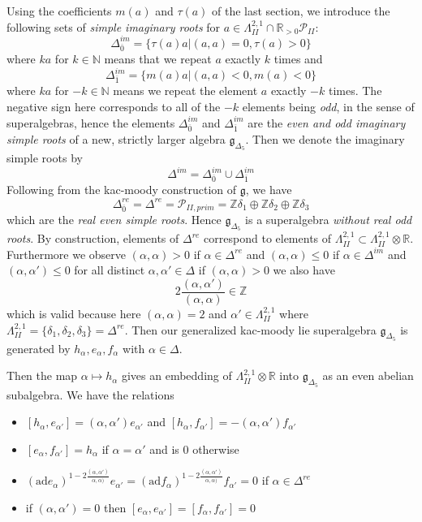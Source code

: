 \documentclass[9pt]{amsart} \usepackage[utf8]{inputenc}
\newcommand{\N}{\mathbb{N}}
\newcommand{\Z}{\mathbb{Z}} \newcommand{\C}{\mathbb{C}}
\newcommand{\R}{\mathbb{R}} \newcommand{\La}{\Lambda}
\newcommand{\Poly}{\mathcal{P}}
\newcommand{\bkm}{\mathfrak{g}}
\newcommand{\autcor}{\mathfrak{g}_{\Delta_5}}
\begin{document}
Using the coefficients $m(a)$ and $\tau(a)$ of the last section, we
introduce the following sets of \textit{simple imaginary roots} for $a \in
\La^{2,1}_{II} \cap \R_{>0} \Poly_{II}$:
$$\Delta_{\overline{0}}^{im} = \{\tau(a)a | (a,a) = 0,\tau(a)>0\}$$
where $ka$ for $k\in \N$ means that we repeat $a$ exactly $k$ times and
$$\Delta_{\overline{1}}^{im} = \{ m(a)a | (a,a) < 0 , m(a)< 0\}$$
where $ka$ for $-k \in \N$ means we repeat the element $a$ exactly $-k$
times. The negative sign here corresponds to all of the $-k$ elements
being \textit{odd}, in the sense of superalgebras, hence the elements
$\Delta_{\overline{0}}^{im}$ and $\Delta_{\overline{1}}^{im}$ are the
\textit{even and odd imaginary simple roots} of a new, strictly larger algebra
$\mathfrak{g}_{\Delta_5}$.
Then we denote the imaginary simple roots by $$\Delta^{im} = \Delta_{\overline{0}}^{im} \cup \Delta_{\overline{1}}^{im}$$
Following from the kac-moody construction of $\bkm$, we
have $$\Delta_{\overline{0}}^{re} = \Delta^{re} = \Poly_{II,prim} = \Z\delta_1 \oplus \Z\delta_2 \oplus \Z\delta_3$$ which are
the \textit{real even simple roots}. Hence
$\autcor$ is a superalgebra \textit{without real odd
roots}. By construction, elements of $\Delta^{re}$ correspond to
elements of $\La^{2,1}_{II} \subset \La^{2,1}_{II}\otimes \R$.
Furthermore we observe $(\alpha,\alpha) > 0$ if $\alpha \in \Delta^{re}$
and $(\alpha,\alpha) \leq 0$ if $\alpha \in \Delta^{im}$ and
$(\alpha,\alpha') \leq 0$ for all distinct $\alpha, \alpha' \in \Delta$ if
$(\alpha,\alpha) > 0$ we also have
$$2\frac{(\alpha,\alpha')}{(\alpha,\alpha)} \in \Z$$ which is valid
because here $(\alpha,\alpha) = 2$ and $\alpha' \in \La^{2,1}_{II}$
where $\La^{2,1}_{II} = \{\delta_1,\delta_2,\delta_3\} = \Delta^{re}$.
Then our generalized kac-moody lie superalgebra
$\autcor$ is generated by $h_{\alpha},
e_{\alpha}, f_{\alpha}$ with $\alpha \in \Delta$.


Then the map $\alpha \mapsto h_{\alpha}$ gives an embedding of
$\La^{2,1}_{II}\otimes\R$ into $\autcor$ as an
even abelian subalgebra. We have the relations

\begin{itemize}
\item $[h_{\alpha}, e_{\alpha'}] = (\alpha, \alpha')e_{\alpha'}$ and
$[h_{\alpha}, f_{\alpha'}] = -(\alpha, \alpha')f_{\alpha'}$
\item $[e_{\alpha}, f_{\alpha'}] = h_{\alpha}$ if $\alpha = \alpha'$ and
is $0$ otherwise
\item $(\textrm{ad} e_{\alpha})^{1- 2\frac{(\alpha,\alpha')}{\alpha,\alpha)}}e_{\alpha'} = (\textrm{ad} f_{\alpha})^{1- 2\frac{(\alpha,\alpha')}{\alpha,\alpha)}}f_{\alpha'} = 0$
if $\alpha \in \Delta^{re}$
\item if $(\alpha,\alpha') = 0$ then $[e_{\alpha}, e_{\alpha'}] = [f_{\alpha},f_{\alpha'}] = 0$
\end{itemize}
\end{document}
